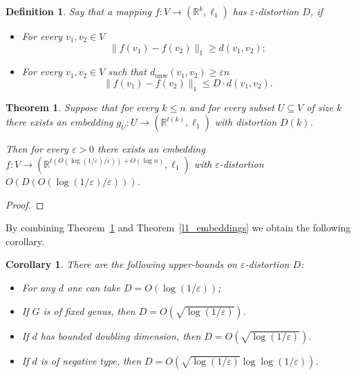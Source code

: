 \documentclass{article}
\newcommand{\dunw}{d_{\mathrm{unw}}}
\newcommand{\eps}{\varepsilon}
\newtheorem{definition}{Definition}
\newtheorem{theorem}{Theorem}
\newtheorem{corollary}{Corollary}
\begin{document}
    \begin{definition}
        Say that a mapping $f \colon V \to (\mathbb{R}^k, \ell_1)$ has $\eps$-distortion $D$, if 
        \begin{itemize}
            \item For every $v_1, v_2 \in V$
            $$
                \|f(v_1) - f(v_2)\|_1 \geq d(v_1, v_2); 
            $$
            \item For every $v_1, v_2 \in V$ such that $\dunw(v_1, v_2) \geq \eps n$
            $$
                \|f(v_1) - f(v_2)\|_1 \leq D \cdot d(v_1, v_2).
            $$
        \end{itemize}
    \end{definition}

    \begin{theorem}
        \label{black_box}
        Suppose that for every $k \leq n$ and for every subset $U \subseteq V$ of size $k$ there exists an embedding 
        $g_U \colon U \to (\mathbb{R}^{t(k)}, \ell_1)$ with distortion $D(k)$.

        Then for every $\eps > 0$ there exists an embedding $f \colon V \to (\mathbb{R}^{t(O(\log(1 / \eps) / \eps)) + O(\log n)}, \ell_1)$ with $\eps$-distortion
        $O(D(O(\log(1 / \eps) / \eps)))$.
    \end{theorem}
    \begin{proof}
    \end{proof}

    By combining Theorem~\ref{black_box} and Theorem~\ref{l1_embeddings} we obtain the following corollary.
    \begin{corollary}
        There are the following upper-bounds on $\eps$-distortion $D$:
        \begin{itemize}
            \item \cite{B85} For any $d$ one can take $D = O(\log (1 / \eps))$;
            \item \cite{R99, IS07} If $G$ is of fixed genus, then $D = O(\sqrt{\log (1 / \eps)})$. 
            \item \cite{GKL03} If $d$ has bounded doubling dimension, then $D = O(\sqrt{\log (1 / \eps)})$.
            \item \cite{ALN05} If $d$ is of negative type, then $D = O(\sqrt{\log (1 / \eps)} \log \log (1 / \eps))$. 
        \end{itemize}
    \end{corollary}

    
    
\end{document}
